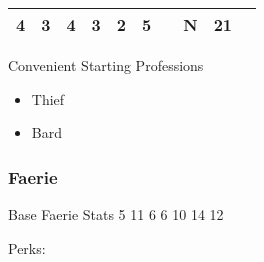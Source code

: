 \documentclass[12pt]{article}
\begin{document}
\begin{longtable}[]{@{}llllllllll@{}}
\begin{minipage}[t]{0.06\columnwidth}\raggedright\strut
4
\strut\end{minipage} &
\begin{minipage}[t]{0.06\columnwidth}\raggedright\strut
3
\strut\end{minipage} &
\begin{minipage}[t]{0.06\columnwidth}\raggedright\strut
4
\strut\end{minipage} &
\begin{minipage}[t]{0.06\columnwidth}\raggedright\strut
3
\strut\end{minipage} &
\begin{minipage}[t]{0.06\columnwidth}\raggedright\strut
2
\strut\end{minipage} &
\begin{minipage}[t]{0.06\columnwidth}\raggedright\strut
5
\strut\end{minipage} &
\begin{minipage}[t]{0.06\columnwidth}\raggedright\strut
\strut\end{minipage} &
\begin{minipage}[t]{0.07\columnwidth}\raggedright\strut
N
\strut\end{minipage} &
\begin{minipage}[t]{0.08\columnwidth}\raggedright\strut
21
\strut\end{minipage}\tabularnewline
\bottomrule
\end{longtable}

Convenient Starting Professions

\begin{itemize}
\item
  Thief
\item
  Bard
\end{itemize}

\subsubsection{Faerie}\label{faerie}

Base Faerie Stats 5 11 6 6 10 14 12

Perks:
\end{document}
